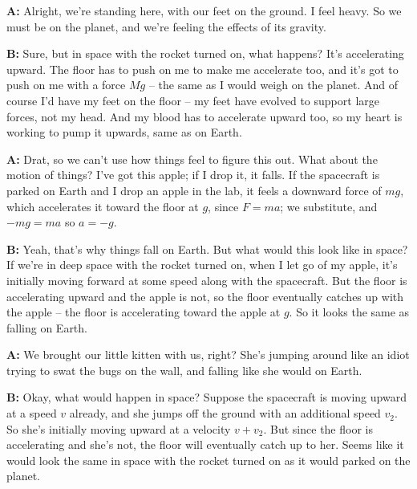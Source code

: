 \documentclass[12pt]{article}
\begin{document}
\begin{center}\underline{\hspace{4in}}\end{center}

{\bf A:} Alright, we're standing here, with our feet on the ground. I feel heavy. So we must be on the planet, and we're feeling the effects of its gravity.

{\bf B:} Sure, but in space with the rocket turned on, what happens? It's accelerating upward. The floor has to push on me to make me accelerate too, and it's got to push on me with a force $Mg$ -- the same as I would weigh on the planet. And of course I'd have my feet on the floor -- my feet have evolved to support large forces, not my head. And my blood has to accelerate upward too, so my heart is working to pump it upwards, same as on Earth.

{\bf A:} Drat, so we can't use how things feel to figure this out. What about the motion of things? I've got this apple; if I drop it, it falls. If the spacecraft is parked on Earth and I drop an apple in the lab, it feels a downward force of $mg$, which accelerates it toward the floor at $g$, since $F = ma$; we substitute, and $-mg = ma$ so $a = -g$. 

{\bf B:} Yeah, that's why things fall on Earth. But what would this look like in space? If we're in deep space with the rocket turned on, when I let go of my apple, it's initially moving forward at some speed along with the spacecraft. But the floor is accelerating upward and the apple is not, so the floor eventually catches up with the apple -- the floor is accelerating toward the apple at $g$. So it looks the same as falling on Earth.

{\bf A:} We brought our little kitten with us, right? She's jumping around like an idiot trying to swat the bugs on the wall, and falling like she would on Earth.

{\bf B:} Okay, what would happen in space? Suppose the spacecraft is moving upward at a speed $v$ already, and she jumps off the ground with an additional speed $v_2$. So she's initially moving upward at a velocity $v + v_2$. But since the floor is accelerating and she's not, the floor will eventually catch up to her. Seems like it would look the same in space with the rocket turned on as it would parked on the planet.
\begin{center}\underline{\hspace{4in}}\end{center}
\end{document}
